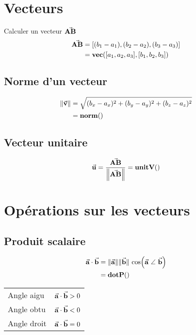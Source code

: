 

\section{Vecteurs}
\vspace{-1.875\baselineskip}
Calculer un vecteur $\va{AB}$
\begin{align*}
    \va{AB} &= \qty[(b_1 - a_1),(b_2-a_2),(b_3-a_3)]\\
    &= \mathbf{vec}(\qty[a_1,a_2,a_3],\qty[b_1,b_2,b_3])
\end{align*}

\subsection{Norme d'un vecteur}
\begin{align*}
    \norm{\va{v}} &=\sqrt{(b_x-a_x)^2+(b_y-a_y)^2+(b_z-a_z)^2}\\
    &= \mathbf{norm}()
\end{align*}

\subsection{Vecteur unitaire}
\begin{equation*}
    \va{u} =\frac{\va{AB}}{\norm{\va{AB}}} = \mathbf{unitV}()
\end{equation*}

\section{Opérations sur les vecteurs}
\vspace{-2\baselineskip}
\subsection{Produit scalaire}
\begin{align*}
    \va{a} \cdot\va{b} &= \norm{\va{a}} \norm*{ \va{b} }\cos(\va{a} ~\angle ~ \va{b})\\
    &= \mathbf{dotP}()
\end{align*}\centering
\begin{tabular}{ll}
Angle aigu & \(\va{a} \cdot\va{b} > 0 \)\\
Angle obtu & \(\va{a} \cdot\va{b} < 0 \)\\
Angle droit & \(\va{a} \cdot\va{b} = 0 \)
\end{tabular}\\
\raggedright

